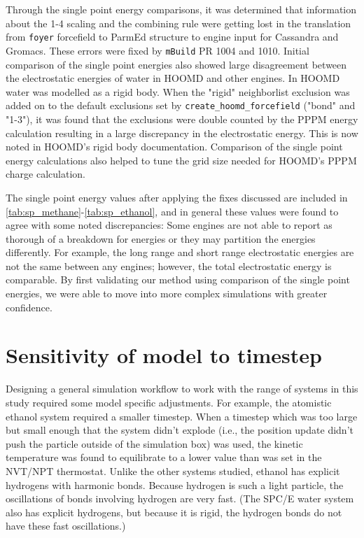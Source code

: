 Through the single point energy comparisons, it was determined that information about the 1-4 scaling and the combining rule were getting lost in the translation from \texttt{foyer} forcefield to ParmEd structure to engine input for Cassandra and Gromacs.
These errors were fixed by \texttt{mBuild} PR 1004 and 1010.
Initial comparison of the single point energies also showed large disagreement between the electrostatic energies of water in HOOMD and other engines. 
In HOOMD water was modelled as a rigid body. 
When the "rigid" neighborlist exclusion was added on to the default exclusions set by \lstinline{create_hoomd_forcefield} ("bond" and "1-3"), it was found that the exclusions were double counted by the PPPM energy calculation resulting in a large discrepancy in the electrostatic energy.
This is now noted in HOOMD's rigid body documentation.
Comparison of the single point energy calculations also helped to tune the grid size needed for HOOMD's PPPM charge calculation. 

The single point energy values after applying the fixes discussed are included in \autoref{tab:sp_methane}-\autoref{tab:sp_ethanol}, and in general these values were found to agree with some noted discrepancies:
Some engines are not able to report as thorough of a breakdown for energies or they may partition the energies differently.
For example, the long range and short range electrostatic energies are not the same between any engines; however, the total electrostatic energy is comparable.
By first validating our method using comparison of the single point energies, we were able to move into more complex simulations with greater confidence.

\section{Sensitivity of model to timestep}

Designing a general simulation workflow to work with the range of systems in this study required some model specific adjustments.
For example, the atomistic ethanol system required a smaller timestep.
When a timestep which was too large but small enough that the system didn't explode (i.e., the position update didn't push the particle outside of the simulation box) was used, the kinetic temperature was found to equilibrate to a lower value than was set in the NVT/NPT thermostat.
Unlike the other systems studied, ethanol has explicit hydrogens with harmonic bonds. 
Because hydrogen is such a light particle, the oscillations of bonds involving hydrogen are very fast.
(The SPC/E water system also has explicit hydrogens, but because it is rigid, the hydrogen bonds do not have these fast oscillations.) 

